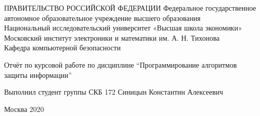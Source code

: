 \documentclass[12pt]{article}
\begin{document}
\begin{titlepage}                                                         
\newpage                                                                        
\begin{center}                                                        
ПРАВИТЕЛЬСТВО РОССИЙСКОЙ ФЕДЕРАЦИИ\linebreak
Федеральное государственное автономное образовательное\linebreak
учреждение высшего образования\\
\vspace{2em}
Национальный исследовательский университет\linebreak
«Высшая школа экономики»\\
\vspace{2em}
Московский институт электроники и математики им. А. Н. Тихонова\\
\vspace{2em}
Кафедра компьютерной безопасности\\
                                                                                                                                                                                                                                                        
\vspace{5em}      
                                                                              
\Large Отчёт\linebreak
по курсовой работе по дисциплине\linebreak
“Программирование алгоритмов защиты информации”\linebreak             
                                                                                                                                         
\vspace{6em}                                                          
\end{center}                                                                                                                            

\begin{flushright}
Выполнил студент группы СКБ 172\linebreak
Синицын Константин Алексеевич\\
\end{flushright}
\vspace{\fill}       

\begin{center}              
Москва 2020
\end{center}

\end{titlepage}     
\end{document}
